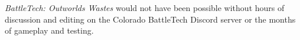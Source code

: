 \emph{BattleTech: Outworlds Wastes} would not have been possible without hours of discussion and editing on the Colorado BattleTech Discord server or the months of gameplay and testing.

